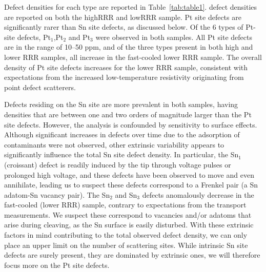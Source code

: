 \par Defect densities for each type are reported in Table~\ref{tab:table1}. defect densities are reported on both the highRRR and lowRRR sample. Pt site defects are significantly rarer than Sn site defects, as discussed below. Of the 6 types of Pt-site defects, Pt$_{1}$,Pt$_{2}$ and Pt$_{3}$ were observed in both samples. All Pt site defects are in the range of 10--50 ppm, and of the three types present in both high and lower RRR samples, all increase in the fast-cooled lower RRR sample. The overall density of Pt site defects increases for the lower RRR sample, consistent with expectations from the increased low-temperature resistivity originating from point defect scatterers.

\par Defects residing on the Sn site are more prevalent in both samples, having densities that are between one and two orders of magnitude larger than the Pt site defects. However, the analysis is confounded by sensitivity to surface effects. Although significant increases in defects over time due to the adsorption of contaminants were not observed, other extrinsic variability appears to significantly influence the total Sn site defect density. In particular, the Sn$_1$ (croissant) defect is readily induced by the tip through voltage pulses or prolonged high voltage, and these defects have been observed to move and even annihilate, leading us to suspect these defects correspond to a Frenkel pair (a Sn adatom-Sn vacancy pair). The Sn$_2$ and Sn$_3$ defects anomalously decrease in the fast-cooled (lower RRR) sample, contrary to expectations from the transport measurements. We suspect these correspond to vacancies and/or adatoms that arise during cleaving, as the Sn surface is easily disturbed. With these extrinsic factors in mind contributing to the total observed defect density, we can only place an upper limit on the number of scattering sites. While intrinsic Sn site defects are surely present, they are dominated by extrinsic ones, we will therefore focus more on the Pt site defects.

